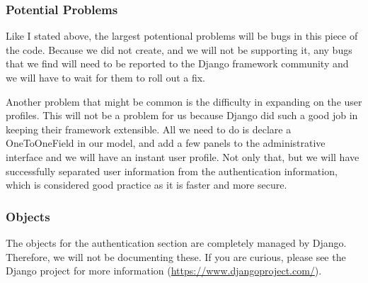 \subsubsection{Potential Problems}

Like I stated above, the largest potentional problems will be bugs in this piece of the code.
Because we did not create, and we will not be supporting it, any bugs that we find will need to be reported to the Django framework community and we will have to wait for them to roll out a fix.

Another problem that might be common is the difficulty in expanding on the user profiles.
This will not be a problem for us because Django did such a good job in keeping their framework extensible.
All we need to do is declare a OneToOneField in our model, and add a few panels to the administrative interface and we will have an instant user profile.
Not only that, but we will have successfully separated user information from the authentication information, which is considered good practice as it is faster and more secure.

\subsubsection{Objects}

The objects for the authentication section are completely managed by Django. 
Therefore, we will not be documenting these.
If you are curious, please see the Django project for more information (\url{https://www.djangoproject.com/}).